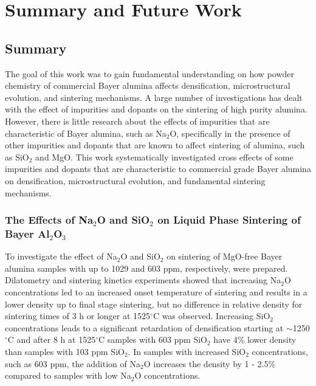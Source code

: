 \chapter{Summary and Future Work}

\section{Summary}
The goal of this work was to gain fundamental understanding on how powder chemistry of commercial Bayer alumina affects densification, microstructural evolution, and sintering mechanisms. A large number of investigations has dealt with the effect of impurities and dopants on the sintering of high purity alumina. However, there is little research about the effects of impurities that are characteristic of Bayer alumina, such as Na$_{2}$O, specifically in the presence of other impurities and dopants that are known to affect sintering of alumina, such as SiO$_{2}$ and MgO. This work systematically investigated cross effects of some impurities and dopants that are characteristic to commercial grade Bayer alumina on densification, microstructural evolution, and fundamental sintering mechanisms. 

\subsection{The Effects of Na$_{2}$O and SiO$_{2}$ on Liquid Phase Sintering of Bayer Al$_{2}$O$_{3}$}
To investigate the effect of Na$_{2}$O and SiO$_{2}$ on sintering of MgO-free Bayer alumina samples with up to 1029 and 603 ppm, respectively, were prepared. Dilatometry and sintering kinetics experiments showed that increasing Na$_{2}$O concentrations led to an increased onset temperature of sintering and results in a lower density up to final stage sintering, but no difference in relative density for sintering times of 3 h or longer at 1525$^{\circ}$C was observed. Increasing SiO$_{2}$ concentrations leads to a significant retardation of densification starting at $\sim$1250$^{\circ}$C and after 8 h at 1525$^{\circ}$C samples with 603 ppm SiO$_{2}$ have 4\% lower density than samples with 103 ppm SiO$_{2}$. In samples with increased SiO$_{2}$ concentrations, such as 603 ppm, the addition of Na$_{2}$O increases the density by 1 - 2.5\% compared to samples with low Na$_{2}$O concentrations. 

